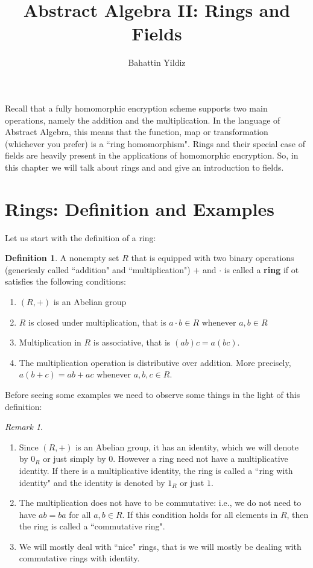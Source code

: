 \documentclass[12pt]{article}
\title{Abstract Algebra II: Rings and Fields}
\author{Bahattin Yildiz }
\date{}
\theoremstyle{plain}
\theoremstyle{definition}
\newtheorem{definition}{Definition}
\theoremstyle{remark}
\newtheorem{remark}{Remark}
\begin{document}
\maketitle

Recall that a fully homomorphic encryption scheme supports two main operations, namely the addition and the multiplication. In the language of Abstract Algebra, this means that the function, map or transformation (whichever you prefer) is a ``ring homomorphism". Rings and their special case of fields are heavily present in the applications of homomorphic encryption. So, in this chapter we will talk about rings and and give an introduction to fields.
\section{Rings: Definition and Examples}
Let us start with the definition of a ring:
\begin{definition}
A nonempty set $R$ that is equipped with two binary operations (genericaly called ``addition" and ``multiplication") $+$ and $\cdot$ is called a {\bf ring} if ot satisfies the following conditions:
\begin{enumerate}
    \item $(R,+)$ is an Abelian group
 \item $R$ is closed under multiplication, that is $a\cdot b \in R$ whenever $a,b\in R$
 \item Multiplication in $R$ is associative, that is $(ab)c=a(bc)$.
 \item The multiplication operation is distributive over addition. More precisely, $a(b+c)=ab+ac$ whenever $a, b, c \in R$.
\end{enumerate}
\end{definition}
Before seeing some examples we need to observe some things in the light of this definition:
\begin{remark}
\begin{enumerate}
    \item Since $(R,+)$ is an Abelian group, it has an identity, which we will denote by $0_R$ or just simply by $0$. However a ring need not have a multiplicative identity. If there is a multiplicative identity, the ring is called a ``ring with identity" and the identity is denoted by $1_R$ or just $1$.
    \item The multiplication does not have to be commutative: i.e., we do not need to have $ab=ba$ for all $a,b \in R$. If this condition holds for all elements in $R$, then the ring is called a ``commutative ring".
    \item We will mostly deal with ``nice" rings, that is we will mostly be dealing with commutative rings with identity. 
\end{enumerate}
\end{remark}
\end{document}
